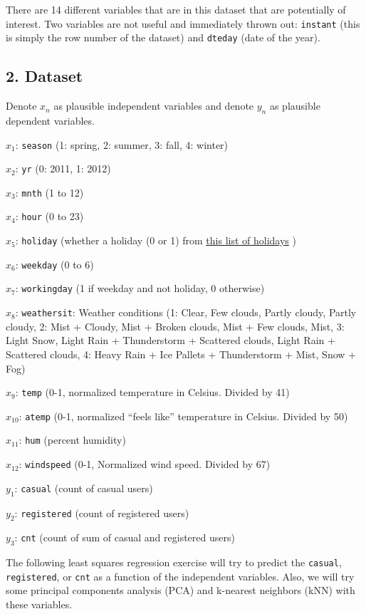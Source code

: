 \documentclass[
]{article}
\begin{document}
There are 14 different variables that are in this dataset that are potentially of interest. Two variables are not useful and immediately thrown out: \texttt{instant} (this is simply the row number of the dataset) and \texttt{dteday} (date of the year).

\hypertarget{Dataset}{%
\subsection{2. Dataset}\label{Dataset}}
Denote \(x_{n}\) as plausible independent variables and denote \(y_{n}\)
as plausible dependent variables.

\(x_{1}\): \texttt{season} (1: spring, 2: summer, 3: fall, 4: winter)

\(x_{2}\): \texttt{yr} (0: 2011, 1: 2012)

\(x_{3}\): \texttt{mnth} (1 to 12)

\(x_{4}\): \texttt{hour} (0 to 23)

\(x_{5}\): \texttt{holiday} (whether a holiday (0 or 1) from
\color{blue}
\href{https://dchrc.dc.gov/page/holiday-schedule}{this list of holidays}
\color{black} )

\(x_{6}\): \texttt{weekday} (0 to 6)

\(x_{7}\): \texttt{workingday} (1 if weekday and not holiday, 0
otherwise)

\(x_{8}\): \texttt{weathersit}: Weather conditions (1: Clear, Few
clouds, Partly cloudy, Partly cloudy, 2: Mist + Cloudy, Mist + Broken
clouds, Mist + Few clouds, Mist, 3: Light Snow, Light Rain +
Thunderstorm + Scattered clouds, Light Rain + Scattered clouds, 4: Heavy
Rain + Ice Pallets + Thunderstorm + Mist, Snow + Fog)

\(x_{9}\): \texttt{temp} (0-1, normalized temperature in Celsius.
Divided by 41)

\(x_{10}\): \texttt{atemp} (0-1, normalized ``feels like'' temperature
in Celsius. Divided by 50)

\(x_{11}\): \texttt{hum} (percent humidity)

\(x_{12}\): \texttt{windspeed} (0-1, Normalized wind speed. Divided by
67)

\(y_{1}\): \texttt{casual} (count of casual users)

\(y_{2}\): \texttt{registered} (count of registered users)

\(y_{3}\): \texttt{cnt} (count of sum of casual and registered users)

The following least squares regression exercise will try to predict the
\texttt{casual}, \texttt{registered}, or \texttt{cnt} as a function of
the independent variables. Also, we will try some principal components
analysis (PCA) and k-nearest neighbors (kNN) with these variables.
\end{document}
